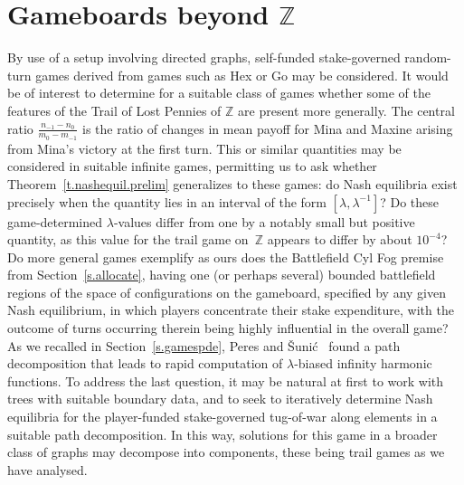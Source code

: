 \documentclass[letterpaper,11pt,oneside,reqno]{amsbook}
\newcommand{\R}{\ensuremath{\mathbb{R}}}
\newcommand{\Z}{\ensuremath{\mathbb{Z}}}
\numberwithin{figure}{chapter}
\theoremstyle{definition}
\theoremstyle{definition}
\theoremstyle{definition}
\theoremstyle{definition}
\theoremstyle{definition}
\begin{document}
\section{Gameboards beyond $\Z$}\label{s.beyond}
By use of a setup involving directed graphs, self-funded stake-governed random-turn games derived from games such as Hex or Go may be considered. It would be of interest to determine for a suitable class of games whether some of the features of the Trail of Lost Pennies of $\Z$ are present more generally. The central ratio $\tfrac{n_{-1} -n_0}{m_0 - m_{-1}}$ is the ratio of changes in mean payoff for Mina and Maxine arising from Mina's victory at the first turn. This or similar quantities may be considered in suitable infinite games, permitting us to ask whether 
Theorem~\ref{t.nashequil.prelim} generalizes to these games: do Nash equilibria exist precisely when the quantity lies in an interval of the form $[\lambda,\lambda^{-1}]$? Do these game-determined $\lambda$-values differ from one by a notably small but positive quantity, as this value for the trail game on~$\Z$ appears to differ by about $10^{-4}$? Do more general games exemplify as ours does the Battlefield Cyl Fog premise from Section~\ref{s.allocate}, having one (or perhaps several) bounded battlefield regions of the space of configurations on the gameboard, specified by any given Nash equilibrium, in which players concentrate their stake expenditure, with the outcome of turns occurring therein being highly influential in the overall game? 
As we recalled in Section~\ref{s.gamespde}, Peres and \v{S}uni\'c~\cite{PeresSunic} found a path decomposition that leads to rapid computation of $\lambda$-biased infinity harmonic functions. To address the last question, it may be natural at first to work with trees with suitable boundary data, and to seek to iteratively determine Nash equilibria for the player-funded stake-governed tug-of-war along elements in a suitable path decomposition. In this way, solutions for this game in a broader class of graphs
may decompose into components, these being trail games as we have analysed.
\end{document}
